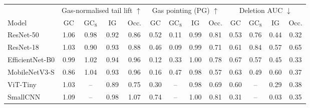 \begin{tabular}{lcccccccccccc}
\hline
 & \multicolumn{4}{c}{Gas-normalised tail lift $\uparrow$} & \multicolumn{4}{c}{Gas pointing (PG) $\uparrow$} & \multicolumn{4}{c}{Deletion AUC $\downarrow$} \\
Model & GC & GC$_{8}$ & IG & Occ. & GC & GC$_{8}$ & IG & Occ. & GC & GC$_{8}$ & IG & Occ. \\
\hline
ResNet-50 & 1.06 & 0.98 & 0.92 & 0.86 & 0.52 & 0.11 & 0.99 & 0.81 & 0.53 & 0.76 & 0.44 & 0.32 \\
ResNet-18 & 1.03 & 0.90 & 0.93 & 0.88 & 0.46 & 0.09 & 0.99 & 0.71 & 0.61 & 0.84 & 0.57 & 0.65 \\
EfficientNet-B0 & 0.99 & 1.02 & 0.94 & 0.96 & 0.12 & 0.33 & 1.00 & 0.78 & 0.67 & 0.57 & 0.45 & 0.33 \\
MobileNetV3-S & 0.86 & 1.04 & 0.93 & 0.96 & 0.16 & 0.47 & 0.98 & 0.57 & 0.63 & 0.49 & 0.60 & 0.37 \\
ViT-Tiny & 1.03 & -- & 0.89 & 0.75 & 0.30 & -- & 0.98 & 0.69 & 0.60 & -- & 0.29 & 0.38 \\
SmallCNN & 1.09 & -- & 0.98 & 1.07 & 0.74 & -- & 1.00 & 0.81 & 0.31 & -- & 0.03 & 0.35 \\
\hline
\end{tabular}
